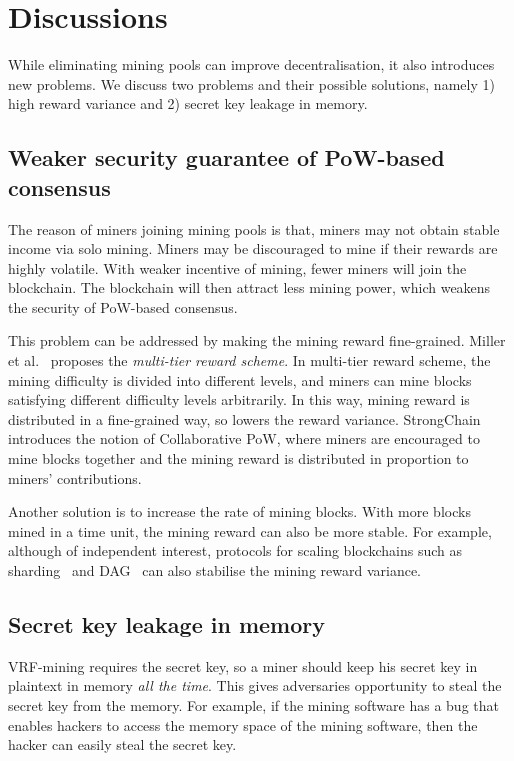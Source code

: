 \section{Discussions}
\label{sec:discussions}

While eliminating mining pools can improve decentralisation, it also introduces new problems.
We discuss two problems and their possible solutions, namely 1) high reward variance and 2) secret key leakage in memory.

\subsection{Weaker security guarantee of PoW-based consensus}

The reason of miners joining mining pools is that, miners may not obtain stable income via solo mining.
Miners may be discouraged to mine if their rewards are highly volatile.
With weaker incentive of mining, fewer miners will join the blockchain.
The blockchain will then attract less mining power, which weakens the security of PoW-based consensus.

This problem can be addressed by making the mining reward fine-grained.
Miller et al.~\cite{miller2015nonoutsourceable} proposes the \emph{multi-tier reward scheme}.
In multi-tier reward scheme, the mining difficulty is divided into different levels, and miners can mine blocks satisfying different difficulty levels arbitrarily.
In this way, mining reward is distributed in a fine-grained way, so lowers the reward variance.
StrongChain~\cite{szalachowski2019strongchain} introduces the notion of Collaborative PoW, where miners are encouraged to mine blocks together and the mining reward is distributed in proportion to miners' contributions.

Another solution is to increase the rate of mining blocks.
With more blocks mined in a time unit, the mining reward can also be more stable.
For example, although of independent interest, protocols for scaling blockchains such as sharding~\cite{wang2019monoxide} and DAG~\cite{li2018scaling} can also stabilise the mining reward variance.



\subsection{Secret key leakage in memory}

VRF-mining requires the secret key, so a miner should keep his secret key in plaintext in memory \emph{all the time}.
This gives adversaries opportunity to steal the secret key from the memory.
For example, if the mining software has a bug that enables hackers to access the memory space of the mining software, then the hacker can easily steal the secret key.

